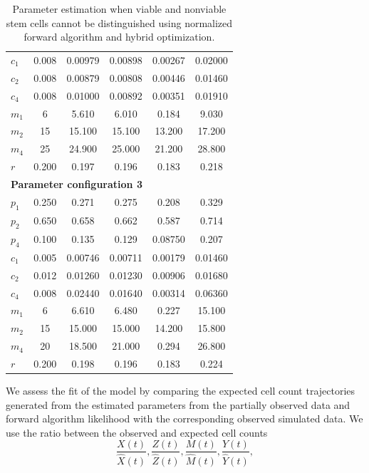 \documentclass[pdflatex,sn-mathphys-num]{sn-jnl}
\theoremstyle{thmstyleone}%
\theoremstyle{thmstyletwo}%
\theoremstyle{thmstylethree}%
\begin{document}
\begin{table}[h]
\begin{tabular}{lccccc}
        $c_1$ & 0.008 & 0.00979 & 0.00898 & 0.00267 & 0.02000 \\
        $c_2$ & 0.008 & 0.00879 & 0.00808 &
        0.00446 & 0.01460\\
        $c_4$ & 0.008 & 0.01000 & 0.00892 & 0.00351 & 0.01910 \\
        $m_1$ & 6 & 5.610  & 6.010 & 0.184 & 9.030 \\
        $m_2$ & 15 & 15.100   & 15.100   &  13.200 & 17.200 \\
        $m_4$ & 25 & 24.900   & 25.000     & 21.200 & 28.800 \\
        $r$ & 0.200  & 0.197  & 0.196  & 0.183 & 0.218 \\
        \multicolumn{4}{l}{\textbf{Parameter configuration 3}} \\
        $p_1$ & 0.250 & 0.271 & 0.275 & 0.208 & 0.329\\
        $p_2$ & 0.650 & 0.658 & 0.662 & 0.587 & 0.714 \\
        $p_4$ & 0.100 & 0.135 & 0.129 & 0.08750 & 0.207 \\
        $c_1$ & 0.005 & 0.00746 & 0.00711 & 0.00179 & 0.01460 \\
        $c_2$ & 0.012 & 0.01260 & 0.01230 & 0.00906 & 0.01680 \\
        $c_4$ & 0.008 & 0.02440 & 0.01640 & 0.00314 & 0.06360 \\
        $m_1$ & 6 & 6.610 & 6.480 & 0.227 & 15.100 \\
        $m_2$ & 15 & 15.000 & 15.000 & 14.200 & 15.800  \\
        $m_4$ & 20 & 18.500  & 21.000   & 0.294 & 26.800 \\
        $r$ & 0.200  & 0.198   & 0.196 & 0.183 & 0.224 \\
        \bottomrule
    \end{tabular}
    \caption{Parameter estimation when viable and nonviable stem cells cannot be distinguished using normalized forward algorithm and hybrid optimization.}
    \label{tab:par_est_forward}
\end{table}
We assess the fit of the model by comparing the expected cell count trajectories generated from the estimated parameters from the partially observed data and forward algorithm likelihood with the corresponding observed simulated data. We use the ratio between the observed and expected cell counts
$$ \frac{X(t)}{\hat{X}(t)}, \frac{Z(t)}{\hat{Z}(t)}, \frac{M(t)}{\hat{M}(t)}, \frac{Y(t)}{\hat{Y}(t)},$$
\end{document}
